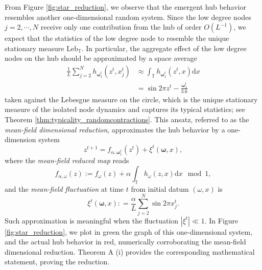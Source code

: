 \documentclass[a4paper]{article}
\theoremstyle{plain}
\theoremstyle{definition}
\newcommand{\T}{\mathbb{T}}
\begin{document}
From Figure \ref{fig:star_reduction}, we observe that the emergent hub behavior resembles another one-dimensional random system.
Since the low degree nodes $j=2,\cdots,N$ receive only one contribution from the hub of order $O(L^{-1})$, %
we expect that the statistics of the low degree node to resemble the unique stationary measure $\mathrm{Leb}_{\T}$. In particular, the aggregate effect of the low degree nodes on the hub should be approximated by a space average 
\begin{align*}
	\frac{1}{L}\sum_{j=2}^N h_{\boldsymbol{\omega}_1^t}(z^t,x_j^t) &\approx \int_{\T} h_{\boldsymbol{\omega}_1^t}(z^t,x)\mathrm{d}x \\
	&= \sin 2\pi z^t - \frac{\boldsymbol{\omega}_1^t}{3.6}
\end{align*}
taken against the Lebesgue measure on the circle, which is the unique stationary measure of the isolated node dynamics and captures its typical statistics; see Theorem \ref{thm:typicality_randomcontractions}.  This ansatz, referred to as the \textit{mean-field dimensional reduction}, approximates the hub behavior by a one-dimension system
\[
z^{t+1} = f_{\alpha, \boldsymbol{\omega}_1^t}(z^t) + \xi^t(\boldsymbol{\omega},x),
\]
where the \textit{mean-field reduced map} reads
\begin{equation}\label{eq:f_alpha_omega}
	f_{\alpha, \omega}(z):= f_{\omega}(z) + \alpha\int_{\T} h_{\omega}(z, x)\mathrm{d}x\mod 1,
\end{equation}
and the \textit{mean-field fluctuation} at time $t$ from initial datum $(\omega,x)$ is
\[
\xi^t(\boldsymbol{\omega},x): = \frac{\alpha}{L} \sum_{j=2}^N \sin 2\pi x_j^t.
\]
Such approximation is meaningful when 
the fluctuation $| \xi^t | \ll 1$.
%
In Figure \ref{fig:star_reduction}, we plot in green the graph of this one-dimensional system, and the actual hub behavior in red, numerically corroborating the mean-field dimensional reduction. Theorem A (i) provides the corresponding mathematical statement, proving the reduction.
\end{document}
